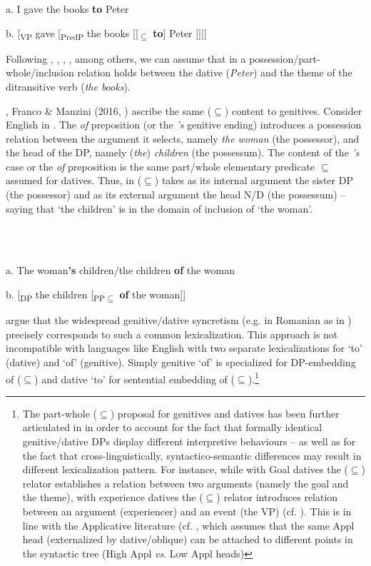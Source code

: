 \documentclass[output=paper,colorlinks,citecolor=brown]{./langscibook}
\begin{document}
           a.  I gave the books \textbf{to} Peter

b.   [\textsubscript{VP} gave [\textsubscript{PredP} the books [[\textsubscript{${\subseteq}$} \textbf{to}] Peter ]]]]

Following \citet{Kayne1984}, \citet{Pesetsky1995}, \citet{BeckJohnson2004}, \citet{Harley2002}, among others, we can assume that in  a possession/part-whole/inclusion relation holds between the dative (\textit{Peter}) and the theme of the ditransitive verb (\textit{the books}). 

\citet{ManziniSavoia2011}, Franco \& Manzini (2016, \citeyear{FrancoManzini2017Gen}) ascribe the same (${\subseteq}$) content to genitives. Consider English in . The \textit{of} preposition (or the \textit{’s} genitive ending) introduces a possession relation between the argument it selects, namely \textit{the woman} (the possessor), and the head of the DP, namely (\textit{the}) \textit{children} (the possessum). The content of the \textit{’s} case or the \textit{of} preposition is the same part/whole elementary predicate ${\subseteq}$ assumed for datives. Thus, in  (${\subseteq}$) takes as its internal argument the sister DP (the possessor) and as its external argument the head N/D (the possessum) – saying that ‘the children’ is in the domain of inclusion of ‘the woman’. 

\ea%
    \label{ex:key:2}
    \gll\\
        \\
    \glt
    \z

           a. The woman\textbf{’s} children/the children \textbf{of} the woman 

b. [\textsubscript{DP} the children [\textsubscript{PP${\subseteq}$} \textbf{of} the woman]] 

\citet{ManziniSavoia2011} argue that the widespread genitive/dative syncretism (e.g. in Romanian as in ) precisely corresponds to such a common lexicalization. This approach is not incompatible with languages like English with two separate lexicalizations for ‘to’ (dative) and ‘of’ (genitive). Simply genitive ‘of’ is specialized for DP-embedding of (${\subseteq}$) and dative ‘to’ for sentential embedding of (${\subseteq}$).\footnote{The part-whole (\textrm{${\subseteq}$}) proposal for genitives and datives has been further articulated in \citet{ManziniFranco2016, FrancoManzini2017Gen} in order to account for the fact that formally identical genitive/dative DPs display different interpretive behaviours – as well as for the fact that cross-linguistically, syntactico-semantic differences may result in different lexicalization pattern. For instance, while with Goal datives the (\textrm{${\subseteq}$}) relator establishes a relation between two arguments (namely the goal and the theme), with experience datives the (\textrm{${\subseteq}$}) relator introduces relation between an argument (experiencer) and an event (the VP) (cf. \citealt[230-231]{ManziniFranco2016}). This is in line with the Applicative literature (cf. \citep{Pylkkänen2008}, which assumes that the same Appl head (externalized by dative/oblique) can be attached to different points in the syntactic tree (High Appl \textit{vs}. Low Appl heads)} 
\end{document}
